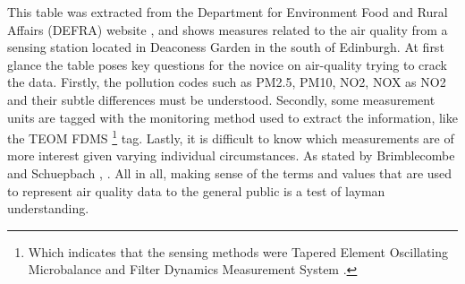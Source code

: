 This table was extracted from the  Department for Environment Food and Rural Affairs (DEFRA) website \cite{DepartmentforEnvironmenta}, and shows measures related to the air quality from a sensing station located in Deaconess Garden in the south of Edinburgh. At first glance the table poses key questions for the novice on air-quality trying to crack the data. Firstly, the pollution codes such as PM2.5, PM10, NO2, NOX as NO2 and their subtle differences must be understood. Secondly, some measurement units are tagged with the monitoring method used to extract the information, like the TEOM FDMS \footnote{Which indicates that the sensing methods were Tapered Element Oscillating Microbalance and Filter Dynamics Measurement System \cite{Quality2005}.} tag. Lastly, it is difficult to know which measurements are of more interest given varying individual circumstances. As stated by Brimblecombe and Schuepbach \cite{P.Brimblecombe2008}, .  All in all, making sense of the terms and values that are used to represent air quality data to the general public is a test of layman understanding.
